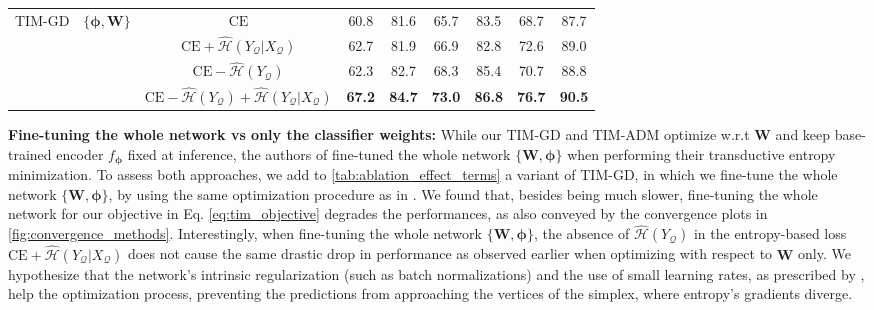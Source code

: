 \documentclass{article}
\begin{document}
\begin{table}[t]
{\begin{tabular}{ccccccccc}
                 \midrule
                 \multirow{4}{*}{TIM-GD} & \multirow{4}{*}{$\{\boldsymbol{\phi}, \textbf{W}\}$}& $\mathrm{CE}$ & 60.8 & 81.6 & 65.7 & 83.5 & 68.7 & 87.7\\
                 & & $\mathrm{CE} + \widehat{\mathcal{H}}(Y_\mathcal{Q}|X_\mathcal{Q})$ & 62.7 & 81.9 & 66.9 & 82.8 & 72.6 & 89.0 \\
                 & & $\mathrm{CE} - \widehat{\mathcal{H}}(Y_\mathcal{Q})$ & 62.3 & 82.7 & 68.3 & 85.4 & 70.7 & 88.8 \\
& & $\mathrm{CE} - \widehat{\mathcal{H}}(Y_\mathcal{Q}) + \widehat{\mathcal{H}}(Y_\mathcal{Q}|X_\mathcal{Q})$ & \textbf{67.2} & \textbf{84.7} & \textbf{73.0} & \textbf{86.8} & \textbf{76.7} & \textbf{90.5} \\
                 \bottomrule
            \end{tabular}}
            \label{tab:ablation_effect_terms}
        \end{table}


        \textbf{Fine-tuning the whole network vs only the classifier weights: }
            While our TIM-GD and TIM-ADM optimize w.r.t $\textbf{W}$ and keep base-trained encoder $f_{\boldsymbol{\phi}}$ fixed at inference, the authors of \cite{dhillon2019baseline} fine-tuned the whole network $\{\textbf{W}, \boldsymbol{\phi}\}$ when performing their transductive entropy minimization. To assess both approaches, we add to \autoref{tab:ablation_effect_terms} a variant of TIM-GD, in which we fine-tune the whole network $\{\textbf{W}, \boldsymbol{\phi}\}$, by using the same optimization procedure as in \cite{dhillon2019baseline}. We found that, besides being much slower, fine-tuning the whole network for our objective in Eq. \ref{eq:tim_objective} degrades the performances, as also conveyed by the convergence plots in \autoref{fig:convergence_methods}. 
Interestingly, when fine-tuning the whole network $\{\textbf{W}, \boldsymbol{\phi}\}$,  the absence of $\widehat{\mathcal{H}}(Y_\mathcal{Q})$ in the entropy-based loss $\mathrm{CE} + \widehat{\mathcal{H}}(Y_\mathcal{Q}|X_\mathcal{Q})$ does not cause the same drastic drop in performance as observed earlier when optimizing with respect to $\textbf{W}$ only. We hypothesize that the network's intrinsic regularization (such as batch normalizations) and the use of small learning rates, as prescribed by \cite{dhillon2019baseline}, help the optimization process, preventing the predictions from approaching the vertices of the simplex, where entropy's gradients diverge.
\end{document}
